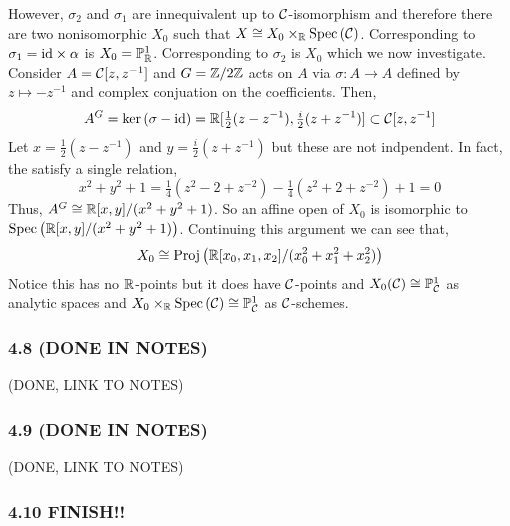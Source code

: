 \documentclass[12pt]{article}
\begin{document}
\begin{enumerate}
\begin{center}
\end{center}
However, $\sigma_2$ and $\sigma_1$ are innequivalent up to $\C$-isomorphism and therefore there are two nonisomorphic $X_0$ such that $X \cong X_0 \times_\R \Spec{\C}$. Corresponding to $\sigma_1 = \mathrm{id} \times \alpha$ is $X_0 = \mathbb{P}^1_{\mathbb{R}}$. Corresponding to $\sigma_2$ is $X_0$ which we now investigate.
\bigskip\\
Consider $A = \C[z, z^{-1}]$ and $G = \mathbb{Z} / 2\mathbb{Z}$ acts on $A$ via $\sigma : A \to A$ defined by $z \mapsto - z^{-1}$ and complex conjuation on the coefficients. Then,
\[ A^G = \ker{(\sigma - \id)} = \R[\tfrac{1}{2}(z - z^{-1}), \tfrac{i}{2}(z + z^{-1})] \subset \C[z, z^{-1}] \]
Let $x = \tfrac{1}{2}(z - z^{-1})$ and $y = \tfrac{i}{2}(z + z^{-1})$ but these are not indpendent. In fact, the satisfy a single relation,
\[ x^2 + y^2 + 1 = \tfrac{1}{4} (z^2 - 2 + z^{-2}) - \tfrac{1}{4} (z^2 + 2 + z^{-2}) + 1 = 0 \]
Thus, $A^G \cong \mathbb{R}[x,y]/(x^2 + y^2 + 1)$. So an affine open of $X_0$ is isomorphic to $\mathrm{Spec}\left( \mathbb{R}[x,y]/(x^2 + y^2 + 1) \right)$. Continuing this argument we can see that,
\[ X_0 \cong \mathrm{Proj}\left( \mathbb{R}[x_0, x_1, x_2]/(x_0^2 + x_1^2 + x_2^2) \right) \]
Notice this has no $\mathbb{R}$-points but it does have $\C$-points and $X_0(\C) \cong \P^1_\C$ as analytic spaces and $X_0 \times_\R \Spec{\C} \cong \P^1_\C$ as $\C$-schemes.
\end{enumerate}

\renewcommand{\C}{\mathcal{C}}

\subsubsection{4.8 (DONE IN NOTES)}

(DONE, LINK TO NOTES)

\subsubsection{4.9 (DONE IN NOTES)}

(DONE, LINK TO NOTES)

\subsubsection{4.10 FINISH!!}
\end{document}
